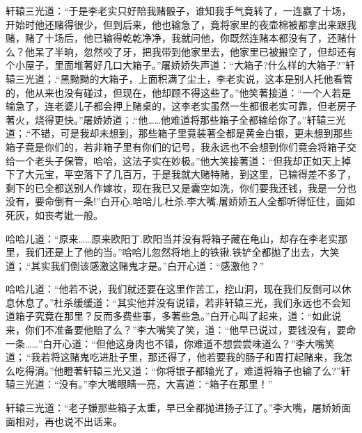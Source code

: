 \documentclass[12pt,oneside]{book}
\begin{document}
轩辕三光道：``于是李老实只好陪我赌骰子，谁知我手气竟转了，一连嬴了十场，开始时他还赌得很少，但到后来，他也输急了，竟将家里的夜壶棉被都拿出来跟我赌，赌了十场后，他已输得乾乾净净，我就问他，你既然连赌本都没有了，还赌什么？他呆了半晌，忽然咬了牙，把我带到他家里去，他家里已被搬空了，但却还有个小屋子，里面堆著好几口大箱子。''屠娇娇失声道：``大箱子?什么样的大箱子?''轩辕三光道；.``黑黝黝的大箱子，上面积满了尘土，李老实说，这本是别人托他看管的，他从来也没有碰过，但现在，他却顾不得这些了。''他笑著接道：``一个人若是输急了，连老婆儿子都会押上赌桌的，这李老实虽然一生都很老实可靠，但老房子著火，烧得更快。''屠娇娇道；.``他\ldots\ldots 他难道将那些箱子全都输给你了。''轩辕三光道；.``不错，可是我却未想到，那些箱子里竟装著全都是黄金白银，更未想到那些箱子竟是你们的，若非箱子里有你们的记号，我永远也不会想到你们竟会将箱子交给一个老头子保管，哈哈，这法子实在妙极。''他大笑接著道：``但我却正如天上掉下了大元宝，平空落下了几百万，于是我就大赌特赌，到这里，已输得差不多了，剩下的已全都送别人作嫁妆，现在我已又是囊空如洗，你们要我还钱，我是一分也没有，要命倒有一条!''白开心.哈哈儿.杜杀.李大嘴.屠娇娇五人全都听得怔住，面如死灰，如丧考妣一般。

哈哈儿道：``原来\ldots\ldots 原来欧阳丁.欧阳当并没有将箱子藏在龟山，却存在李老实那里，我们还是上了他的当。''哈哈儿忽然将地上的铁锹.铁铲全都抛了出去，大笑道；.``其实我们倒该感激这赌鬼才是。''白开心道：``感激他？''

哈哈儿道：``他若不说，我们就还要在这里作苦工，挖山洞，现在我们反倒可以休息休息了。''杜杀缓缓道：``其实他并没有说错，若非轩辕三光，我们永远也不会知道箱子究竟在那里？反而多费些事，多著些急。''白开心叫了起来，道：``如此说来，你们不准备要他赔了么？''李大嘴笑了笑，道：``他早已说过，要钱没有，要命一条\ldots\ldots{}''白开心道：``但他这身肉也不错，你难道不想尝尝味道么？''李大嘴笑道；.``我若将这赌鬼吃进肚子里，那还得了，他若要我的肠子和胃打起赌来，我怎么吃得消。''他瞪著轩辕三光又道：``你将银子都输光了，难道将箱子也输了么?''轩辕三光道：``没有。''李大嘴眼睛一亮，大喜道：``箱子在那里！''

轩辕三光道：``老子嫌那些箱子太重，早已全都抛进扬子江了。''李大嘴，屠娇娇面面相对，再也说不出话来。
\end{document}
